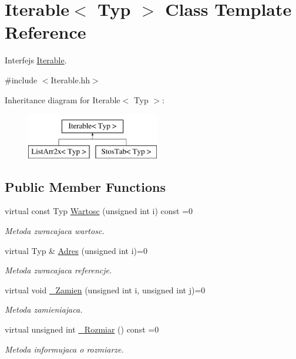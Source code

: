 \hypertarget{class_iterable}{\section{Iterable$<$ Typ $>$ Class Template Reference}
\label{class_iterable}
}


Interfejs \hyperlink{class_iterable}{Iterable}.  




{\ttfamily \#include $<$Iterable.\-hh$>$}

Inheritance diagram for Iterable$<$ Typ $>$\-:\begin{figure}[H]
\begin{center}
\leavevmode
\includegraphics[height=2.000000cm]{class_iterable}
\end{center}
\end{figure}
\subsection*{Public Member Functions}
\begin{DoxyCompactItemize}
\item 
virtual const Typ \hyperlink{class_iterable_a6b75a7c8c41e1f13e6eff2276af62aeb}{Wartosc} (unsigned int i) const =0
\begin{DoxyCompactList}\small\item\em Metoda zwracajaca wartosc. \end{DoxyCompactList}\item 
virtual Typ \& \hyperlink{class_iterable_a7e56512db9ef2691198e1914a4ddb300}{Adres} (unsigned int i)=0
\begin{DoxyCompactList}\small\item\em Metoda zwracajaca referencje. \end{DoxyCompactList}\item 
virtual void \hyperlink{class_iterable_a631b741c6f81ae09f823c86f9eed9f7b}{\-\_\-\-Zamien} (unsigned int i, unsigned int j)=0
\begin{DoxyCompactList}\small\item\em Metoda zamieniajaca. \end{DoxyCompactList}\item 
virtual unsigned int \hyperlink{class_iterable_ab5962acaeaa36a245b18a7c66fac972f}{\-\_\-\-Rozmiar} () const =0
\begin{DoxyCompactList}\small\item\em Metoda informujaca o rozmiarze. \end{DoxyCompactList}\end{DoxyCompactItemize}


